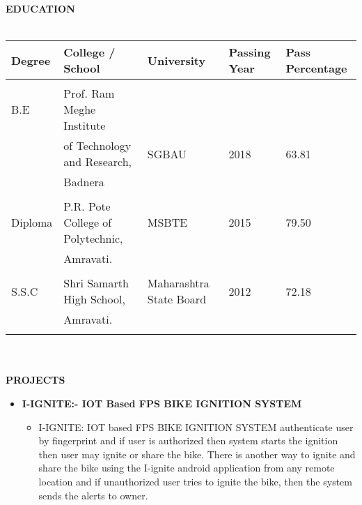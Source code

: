 \documentclass[a4paper,20pt]{article}
\newcommand{\isep}{-2 pt}
\begin{document}
\textbf{{\large EDUCATION}}
\\ \\
\indent \begin{tabular}{ l @{\hskip 0.15in} l @{\hskip 0.15in} l @{\hskip 0.15in} l @{\hskip 0.15in} l }
\hline
\textbf{Degree} & \textbf{College / School} & \textbf{University} & \textbf{Passing Year} & \textbf{Pass Percentage} \\ 
\hline
\\
B.E\,\, & \textsf{Prof. Ram Meghe Institute } \\
  & of Technology and Research,& SGBAU  & 2018 &  63.81 \\ & Badnera   \\ \\
Diploma  & \textsf{P.R. Pote College of Polytechnic,} & MSBTE & 2015 & 79.50  \\ &  Amravati. \\
\\ S.S.C  & \textsf{ Shri Samarth High School,} & Maharashtra State Board & 2012 & 72.18  \\ &  Amravati. \\
\hline
\newline
\end{tabular}
\\ \\





\textbf{{\large  PROJECTS} }
\begin{itemize}
\item \textbf{I-IGNITE:- IOT Based FPS BIKE IGNITION SYSTEM
}  
 
	\begin{itemize}\itemsep \isep
	\item[] I-IGNITE: IOT based FPS BIKE IGNITION SYSTEM authenticate user by fingerprint and if user is authorized then system starts the ignition then user may ignite or share the bike. There is another way to ignite and share the bike using the I-ignite android application from any remote location and if unauthorized user tries to ignite the bike, then the system sends the alerts to owner. 


	\end{itemize}
\indent
	\end{itemize}
\end{document}
